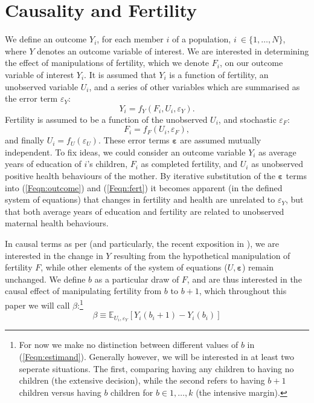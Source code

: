 \section{Causality and Fertility}
\label{Fscn:causality}
We define an outcome $Y_i$, for each member $i$ of a population, $i\ \in \{1,
\ldots,N\}$, where $Y$ denotes an outcome variable of interest. We are 
interested in determining the effect of manipulations of fertility, which we
denote $F_i$, on our outcome variable of interest $Y_i$.  It is assumed that 
$Y_i$ is a function of fertility, an unobserved variable $U_i$, and a series of 
other variables which are summarised as the error term $\varepsilon_Y$:
\begin{equation}
\label{Feqn:outcome}
Y_i=f_Y(F_i,U_i,\varepsilon_Y).
\end{equation}
Fertility is assumed to be a function of the unobserved $U_i$, and stochastic 
$\varepsilon_F$:
\begin{equation}
\label{Feqn:fert}
F_i=f_F(U_i,\varepsilon_F),
\end{equation}
and finally $U_i=f_U(\varepsilon_U)$. These error terms $\bm\varepsilon$ are 
assumed mutually independent. To fix ideas, we could consider an outcome variable 
$Y_i$ as average years of education of $i$'s children, $F_i$ as completed 
fertility, and $U_i$ as unobserved positive health behaviours of the mother. By 
iterative substitution of the $\bm\varepsilon$ terms into (\ref{Feqn:outcome}) 
and (\ref{Feqn:fert}) it becomes apparent (in the defined system of equations) 
that changes in fertility and health are unrelated to $\varepsilon_Y$, but that 
both average years of education and fertility are related to unobserved maternal 
health behaviours.

In causal terms as per \citet{Haavelmo1943,Haavelmo1944} (and particularly, the
recent exposition in \citet{HeckmanPinto2015}), we are interested in the change
in $Y$ resulting from the hypothetical manipulation of fertility $F$, while 
other elements of the system of equations ($U,\bm\varepsilon$) remain unchanged.  
We define $b$ as a particular draw of $F$, and are thus interested in the causal 
effect of manipulating fertility from $b$ to $b+1$, which throughout this paper
we will call $\beta$:\footnote{For now we make no distinction between different 
values of $b$ in (\ref{Feqn:estimand}).  Generally however, we will be interested 
in at least two seperate situations. The first, comparing having any children 
to having no children (the extensive decision), while the second refers to 
having $b+1$ children versus having $b$ children for $b\in{1,\ldots,k}$ (the 
intensive margin).}
\begin{equation}
\label{Feqn:estimand}
\beta\equiv\mathbb{E}_{U_i,\varepsilon_Y}[Y_i(b_i+1)-Y_i(b_i)]
\end{equation}

